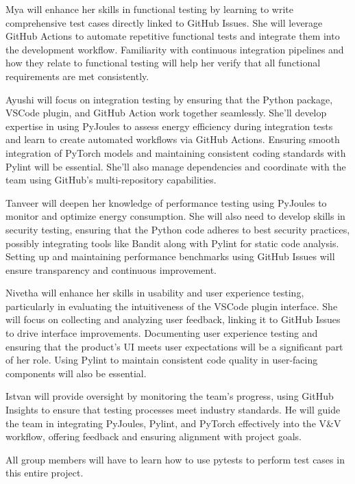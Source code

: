 \documentclass[12pt, titlepage]{article}
\begin{document}
\begin{appendices}
\begin{itemize}
  Mya will enhance her skills in functional testing by learning to write comprehensive 
  test cases directly linked to GitHub Issues. She will leverage GitHub Actions to 
  automate repetitive functional tests and integrate them into the development workflow. 
  Familiarity with continuous integration pipelines and how they relate to functional 
  testing will help her verify that all functional requirements are met consistently.

  Ayushi will focus on integration testing by ensuring that the Python package, VSCode 
  plugin, and GitHub Action work together seamlessly. She’ll develop expertise in using 
  PyJoules to assess energy efficiency during integration tests and learn to create 
  automated workflows via GitHub Actions. Ensuring smooth integration of PyTorch models 
  and maintaining consistent coding standards with Pylint will be essential. She’ll 
  also manage dependencies and coordinate with the team using GitHub’s multi-repository 
  capabilities.

  Tanveer will deepen her knowledge of performance testing using PyJoules to monitor 
  and optimize energy consumption. She will also need to develop skills in security 
  testing, ensuring that the Python code adheres to best security practices, possibly 
  integrating tools like Bandit along with Pylint for static code analysis. Setting 
  up and maintaining performance benchmarks using GitHub Issues will ensure transparency 
  and continuous improvement.

  Nivetha will enhance her skills in usability and user experience testing, particularly 
  in evaluating the intuitiveness of the VSCode plugin interface. She will focus on 
  collecting and analyzing user feedback, linking it to GitHub Issues to drive interface 
  improvements. Documenting user experience testing and ensuring that the product’s UI 
  meets user expectations will be a significant part of her role. Using Pylint to maintain 
  consistent code quality in user-facing components will also be essential.

  Istvan will provide oversight by monitoring the team’s progress, using GitHub Insights 
  to ensure that testing processes meet industry standards. He will guide the team in 
  integrating PyJoules, Pylint, and PyTorch effectively into the V\&V workflow, offering 
  feedback and ensuring alignment with project goals.

  All group members will have to learn how to use pytests to perform test cases in this
  entire project.


\end{itemize}
\end{appendices}
\end{document}
